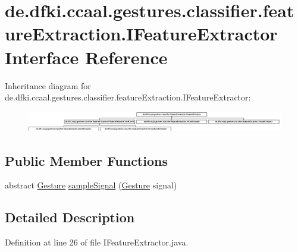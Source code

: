 \hypertarget{interfacede_1_1dfki_1_1ccaal_1_1gestures_1_1classifier_1_1feature_extraction_1_1_i_feature_extractor}{\section{de.\-dfki.\-ccaal.\-gestures.\-classifier.\-feature\-Extraction.\-I\-Feature\-Extractor Interface Reference}
\label{interfacede_1_1dfki_1_1ccaal_1_1gestures_1_1classifier_1_1feature_extraction_1_1_i_feature_extractor}
}
Inheritance diagram for de.\-dfki.\-ccaal.\-gestures.\-classifier.\-feature\-Extraction.\-I\-Feature\-Extractor\-:\begin{figure}[H]
\begin{center}
\leavevmode
\includegraphics[height=0.899358cm]{interfacede_1_1dfki_1_1ccaal_1_1gestures_1_1classifier_1_1feature_extraction_1_1_i_feature_extractor}
\end{center}
\end{figure}
\subsection*{Public Member Functions}
\begin{DoxyCompactItemize}
\item 
abstract \hyperlink{classde_1_1dfki_1_1ccaal_1_1gestures_1_1_gesture}{Gesture} \hyperlink{interfacede_1_1dfki_1_1ccaal_1_1gestures_1_1classifier_1_1feature_extraction_1_1_i_feature_extractor_a53d467bc0aa6dda71eb5c3c8418a71b0}{sample\-Signal} (\hyperlink{classde_1_1dfki_1_1ccaal_1_1gestures_1_1_gesture}{Gesture} signal)
\end{DoxyCompactItemize}


\subsection{Detailed Description}


Definition at line 26 of file I\-Feature\-Extractor.\-java.



